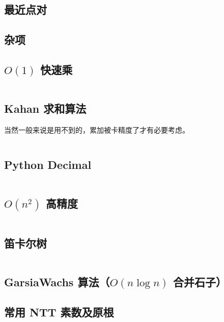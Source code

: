 \documentclass[a4paper, twoside]{article}
\begin{document}
			\subsection{最近点对}
				

		\newpage
	
	\begin{multicols}{2}
		\section{杂项}
			\subsection{$O(1)$ 快速乘}

				\inputminted{cpp}{../src/misc/O(1)快速乘.cpp}
			
			\subsection[Kahan 求和算法（减少浮点数累加的误差）]{Kahan 求和算法}
				当然一般来说是用不到的，累加被卡精度了才有必要考虑。
				\inputminted{cpp}{../src/misc/kahan.cpp}
			
			\subsection{Python Decimal}
				\inputminted{python}{../src/misc/decimal.py}
			
			\subsection{$O(n^2)$ 高精度}
				\inputminted{cpp}{../src/misc/高精度.cpp}
			
			\subsection{笛卡尔树}
				\inputminted{cpp}{../src/misc/笛卡尔树.cpp}
			
			\subsection{GarsiaWachs 算法（$O(n\log n)$ 合并石子）}
				
			
			\subsection{常用 NTT 素数及原根}
				


\end{multicols}
\end{document}
